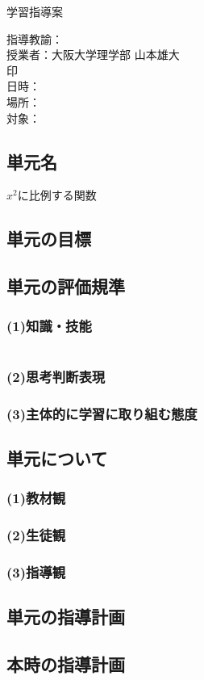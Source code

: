 \documentclass{ltjsarticle}
\begin{document}
\begin{center}
  \Large{学習指導案}
\end{center}
\hfill 指導教諭：\\
\hfill 授業者：大阪大学理学部 山本雄大\\
\hfill 印\\
日時：\\
場所：\\
対象：\\
\subsection{単元名}
  \(x^2\)に比例する関数
\subsection{単元の目標}

\subsection{単元の評価規準}
\subsubsection*{(1)知識・技能}
  \(\)
\subsubsection*{(2)思考判断表現}

\subsubsection*{(3)主体的に学習に取り組む態度}

\subsection{単元について}
  \subsubsection*{(1)教材観}

  \subsubsection*{(2)生徒観}

  \subsubsection*{(3)指導観}

\subsection{単元の指導計画}
\subsection{本時の指導計画}
\end{document}
